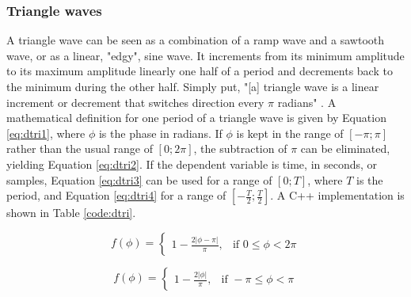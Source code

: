   \begin{table}
  \end{table}

  \pagebreak

  \subsubsection{Triangle waves}

  A triangle wave can be seen as a combination of a ramp wave and a sawtooth wave, or as a linear, "edgy", sine wave. It increments from its minimum amplitude to its maximum amplitude linearly one half of a period and decrements back to the minimum during the other half. Simply put, "[a] triangle wave is a linear increment or decrement that switches direction every $\pi$ radians" . A mathematical definition for one period of a triangle wave is given by Equation  \ref{eq:dtri1}, where $\phi$ is the phase in radians. If $\phi$ is kept in the range of $[-\pi;\pi]$ rather than the usual range of $[0;2 \pi]$, the subtraction of $\pi$ can be eliminated, yielding Equation  \ref{eq:dtri2}. If the dependent variable is time, in seconds, or samples, Equation  \ref{eq:dtri3} can be used for a range of $[0;T]$, where $T$ is the period, and Equation  \ref{eq:dtri4} for a range of $[-\frac{T}{2};\frac{T}{2}]$. A C++ implementation is shown in Table \ref{code:dtri}.

  \begin{multicols}{2}

    \begin{equation}
      f(\phi) =
      \begin{cases}
        1 - \frac{2 |\phi - \pi|}{\pi},& \text{if } 0 \leq \phi < 2 \pi
      \end{cases}
      \label{eq:dtri1}
    \end{equation}

    \begin{equation}
      f(\phi) =
      \begin{cases}
        1 - \frac{2 |\phi|}{\pi},& \text{if } -\pi \leq \phi < \pi
      \end{cases}
      \label{eq:dtri2}
    \end{equation}

  \end{multicols}

